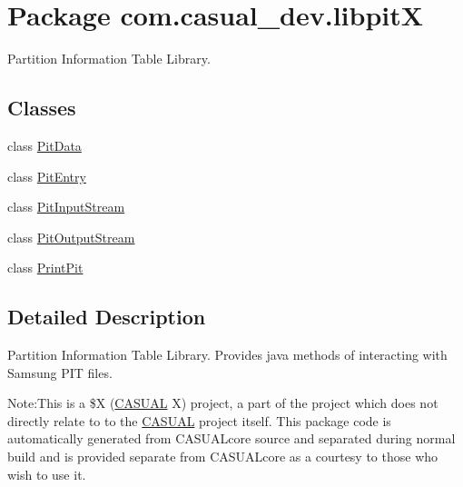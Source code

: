\hypertarget{namespacecom_1_1casual__dev_1_1libpitX}{\section{Package com.\-casual\-\_\-dev.\-libpit\-X}
\label{namespacecom_1_1casual__dev_1_1libpitX}
}


Partition Information Table Library.  


\subsection*{Classes}
\begin{DoxyCompactItemize}
\item 
class \hyperlink{classcom_1_1casual__dev_1_1libpitX_1_1PitData}{Pit\-Data}
\item 
class \hyperlink{classcom_1_1casual__dev_1_1libpitX_1_1PitEntry}{Pit\-Entry}
\item 
class \hyperlink{classcom_1_1casual__dev_1_1libpitX_1_1PitInputStream}{Pit\-Input\-Stream}
\item 
class \hyperlink{classcom_1_1casual__dev_1_1libpitX_1_1PitOutputStream}{Pit\-Output\-Stream}
\item 
class \hyperlink{classcom_1_1casual__dev_1_1libpitX_1_1PrintPit}{Print\-Pit}
\end{DoxyCompactItemize}


\subsection{Detailed Description}
Partition Information Table Library. Provides java methods of interacting with Samsung P\-I\-T files.

Note\-:This is a \$\-X (\hyperlink{namespaceCASUAL}{C\-A\-S\-U\-A\-L} X) project, a part of the project which does not directly relate to to the \hyperlink{namespaceCASUAL}{C\-A\-S\-U\-A\-L} project itself. This package code is automatically generated from C\-A\-S\-U\-A\-Lcore source and separated during normal build and is provided separate from C\-A\-S\-U\-A\-Lcore as a courtesy to those who wish to use it.

